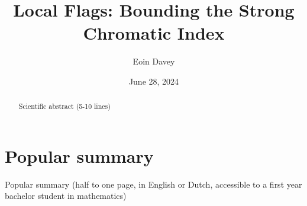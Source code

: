 \documentclass{uvamath}
\title{Local Flags: Bounding the Strong Chromatic Index} %
\author[eoin.davey@student.uva.nl, 14246287]{Eoin Davey} %
\date{June 28, 2024} %
\begin{document}
\maketitle

\begin{abstract}
Scientific abstract (5-10 lines)
\end{abstract}

\setcounter{tocdepth}{1}
\tableofcontents











\chapter*{Popular summary}
Popular summary (half to one page, in English or Dutch, accessible to a first year bachelor student in mathematics)

\printbibliography{}
\end{document}
